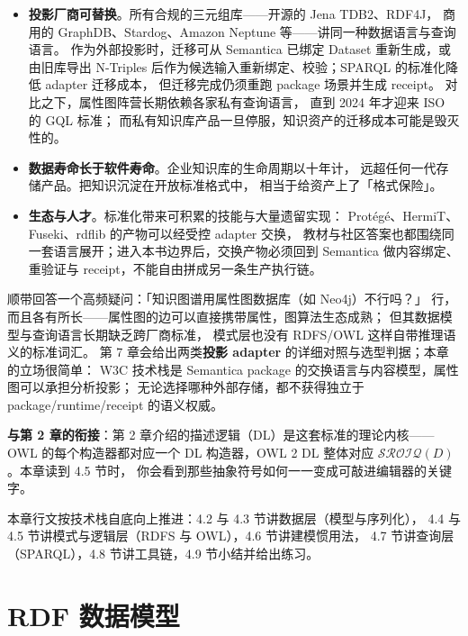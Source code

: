 \begin{itemize}
  \item \textbf{投影厂商可替换}。所有合规的三元组库——开源的 Jena TDB2、RDF4J，
        商用的 GraphDB、Stardog、Amazon Neptune 等——讲同一种数据语言与查询语言。
        作为外部投影时，迁移可从 Semantica 已绑定 Dataset 重新生成，或由旧库导出
        N-Triples 后作为候选输入重新绑定、校验；SPARQL 的标准化降低 adapter 迁移成本，
        但迁移完成仍须重跑 package 场景并生成 receipt。
        对比之下，属性图阵营长期依赖各家私有查询语言，
        直到 2024 年才迎来 ISO 的 GQL 标准；
        而私有知识库产品一旦停服，知识资产的迁移成本可能是毁灭性的。
  \item \textbf{数据寿命长于软件寿命}。企业知识库的生命周期以十年计，
        远超任何一代存储产品。把知识沉淀在开放标准格式中，
        相当于给资产上了「格式保险」。
  \item \textbf{生态与人才}。标准化带来可积累的技能与大量遗留实现：
        Protégé、HermiT、Fuseki、rdflib 的产物可以经受控 adapter 交换，
        教材与社区答案也都围绕同一套语言展开；进入本书边界后，交换产物必须回到
        Semantica 做内容绑定、重验证与 receipt，不能自由拼成另一条生产执行链。
\end{itemize}

顺带回答一个高频疑问：「知识图谱用属性图数据库（如 Neo4j）不行吗？」
行，而且各有所长——属性图的边可以直接携带属性，图算法生态成熟；
但其数据模型与查询语言长期缺乏跨厂商标准，
模式层也没有 RDFS/OWL 这样自带推理语义的标准词汇。
第 7 章会给出两类\textbf{投影 adapter} 的详细对照与选型判据；本章的立场很简单：
W3C 技术栈是 Semantica package 的交换语言与内容模型，属性图可以承担分析投影；
无论选择哪种外部存储，都不获得独立于 package/runtime/receipt 的语义权威。

\begin{noteblock}
\textbf{与第 2 章的衔接}：第 2 章介绍的描述逻辑（DL）是这套标准的理论内核——
OWL 的每个构造器都对应一个 DL 构造器，OWL 2 DL 整体对应
\(\mathcal{SROIQ}(D)\)。本章读到 4.5 节时，
你会看到那些抽象符号如何一一变成可敲进编辑器的关键字。
\end{noteblock}

本章行文按技术栈自底向上推进：4.2 与 4.3 节讲数据层（模型与序列化），
4.4 与 4.5 节讲模式与逻辑层（RDFS 与 OWL），4.6 节讲建模惯用法，
4.7 节讲查询层（SPARQL），4.8 节讲工具链，4.9 节小结并给出练习。

\section{RDF 数据模型}


